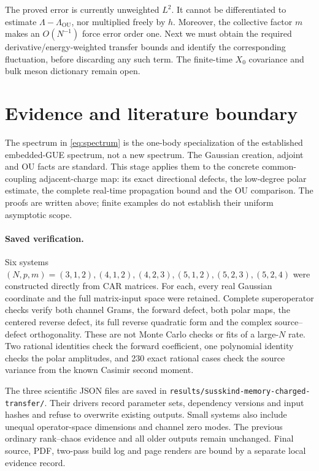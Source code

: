 \documentclass[11pt,a4paper]{article}
\begin{document}
The proved error is currently unweighted $L^2$. It cannot be
differentiated to estimate $\Lambda-\Lambda_{\mathrm{OU}}$, nor
multiplied freely by $h$. Moreover, the collective factor $m$ makes
an $O(N^{-1})$ force error order one. Next we must obtain the
required derivative/energy-weighted transfer bounds and identify
the corresponding fluctuation, before discarding any such term.
The finite-time $X_0$ covariance and bulk meson dictionary remain open.

\newpage
\section{Evidence and literature boundary}
The spectrum in \eqref{eq:spectrum} is the one-body specialization
of the established embedded-GUE spectrum, not a new spectrum.
The Gaussian creation, adjoint and OU facts are standard. This
stage applies them to the concrete common-coupling adjacent-charge
map: its exact directional defects, the low-degree polar estimate,
the complete real-time propagation bound and the OU comparison.
The proofs are written above; finite examples do not establish
their uniform asymptotic scope.

\paragraph{Saved verification.}
Six systems $(N,p,m)=(3,1,2),(4,1,2),(4,2,3),(5,1,2),
(5,2,3),(5,2,4)$ were constructed directly from CAR matrices.
For each, every real Gaussian coordinate and the full matrix-input
space were retained. Complete superoperator checks verify both
channel Grams, the forward defect, both polar maps, the centered
reverse defect, its full reverse quadratic form and the complex
source--defect orthogonality. These are not Monte Carlo checks or
fits of a large-$N$ rate. Two rational identities check the forward
coefficient, one polynomial identity checks the polar amplitudes,
and 230 exact rational cases check the source variance from the
known Casimir second moment.

The three scientific JSON files are saved in
\texttt{results/susskind-memory-charged-transfer/}. Their drivers
record parameter sets, dependency versions and input hashes and
refuse to overwrite existing outputs. Small systems also include
unequal operator-space dimensions and channel zero modes. The
previous ordinary rank--chaos evidence and all older outputs remain
unchanged. Final source, PDF, two-pass build log and page renders
are bound by a separate local evidence record.
\end{document}
